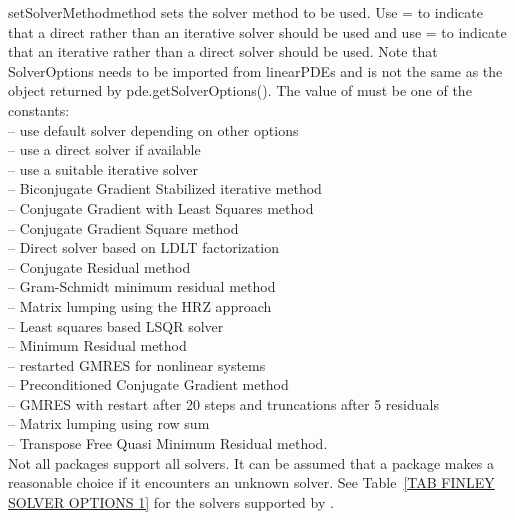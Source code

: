 \begin{methoddesc}[SolverOptions]{setSolverMethod}{method}
sets the solver method to be used.
Use = to indicate that a direct
rather than an iterative solver should be used and use
= to indicate that an iterative
rather than a direct solver should be used. Note that SolverOptions needs to be
imported from linearPDEs and is not the same as the object returned by pde.getSolverOptions().
The value of  must be one of the constants:\\
  -- use default solver depending on other options\\
  -- use a direct solver if available\\
  -- use a suitable iterative solver\\
  -- Biconjugate Gradient Stabilized iterative method\\
  -- Conjugate Gradient with Least Squares method\\
  -- Conjugate Gradient Square method\\
  -- Direct solver based on LDLT factorization\\
  -- Conjugate Residual method\\
  -- Gram-Schmidt minimum residual method\\
  -- Matrix lumping using the HRZ approach\\
  -- Least squares based LSQR solver\\
  -- Minimum Residual method\\
  -- restarted GMRES for nonlinear systems\\
  -- Preconditioned Conjugate Gradient method\\
  -- GMRES with restart after 20 steps and truncations after 5 residuals\\
  -- Matrix lumping using row sum\\
  -- Transpose Free Quasi Minimum Residual method.\\
Not all packages support all solvers. It can be assumed that a package makes a
reasonable choice if it encounters an unknown solver.
See Table~\ref{TAB FINLEY SOLVER OPTIONS 1} for the solvers supported by
\finley.
\end{methoddesc}

